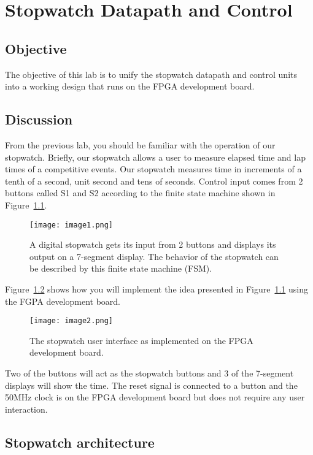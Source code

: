 \chapter{Stopwatch Datapath and Control}
\label{chapter:swDpAndCu}
\graphicspath{ {./Lab11Stopwatch/Fig} }

\hypertarget{objective}{%
\section{Objective }\label{section:swComplete}}

The objective of this lab is to unify the stopwatch datapath and control
units into a working design that runs on the FPGA development
board.

\section{Discussion}

From the previous lab, you should be familiar with the operation of our
stopwatch. Briefly, our stopwatch allows a user to measure elapsed time
and lap times of a competitive events. Our stopwatch measures time in
increments of a tenth of a second, unit second and tens of seconds.
Control input comes from 2 buttons called S1 and S2 according to the
finite state machine shown in Figure~\ref{fig:swHighLevel}.

\begin{figure}[ht]
\texttt{[image: image1.png]}
\caption{A digital stopwatch gets its input from 2 buttons and displays
its output on a 7-segment display. The behavior of the stopwatch can be
described by this finite state machine (FSM).}
\label{fig:swHighLevel}
\end{figure}

Figure~\ref{fig:swDevBoard} shows how you will implement the idea presented in Figure~\ref{fig:swHighLevel}
using the FGPA development board.

\begin{figure}[ht]
\texttt{[image: image2.png]}
\caption{The stopwatch user interface as implemented on the FPGA
development board.}
\label{fig:swDevBoard}
\end{figure}

Two of the buttons will act as the stopwatch buttons
and 3 of the 7-segment displays will show the time. The reset signal is
connected to a button and the 50MHz clock is on the FPGA
development board but does not require any user
interaction.

\section{Stopwatch architecture}


